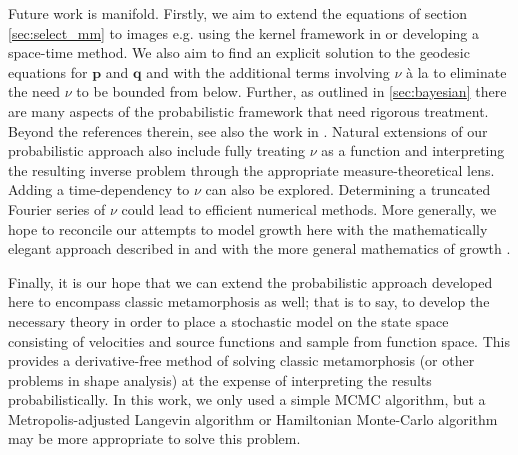 \documentclass[runningheads]{llncs}
\begin{document}
Future work is manifold. Firstly, we aim to extend the equations of section
\ref{sec:select_mm} to images e.g. using the kernel framework in
\cite{richardson2016metamorphosis} or developing a space-time method. We also
aim to find an explicit solution to the geodesic equations for $\mathbf p$ and
$\mathbf q$ and with the additional terms involving $\nu$ à la
\cite{trouve2005local} to eliminate the need $\nu$ to be bounded from below.
Further, as outlined in \ref{sec:bayesian} there
are many aspects of the probabilistic framework that need rigorous treatment.
Beyond the references therein, see also the work in \cite{dashti2013map}.
Natural extensions of our probabilistic approach also include fully treating
$\nu$ as a function and interpreting the resulting inverse problem through the
appropriate measure-theoretical lens. Adding a time-dependency to $\nu$ can also
be explored. Determining a truncated Fourier series of $\nu$ could lead to
efficient numerical methods. More generally, we hope to reconcile our attempts
to model growth here with the mathematically elegant approach described in
\cite{kaltenmark2016geometrical} and with the more general mathematics of growth
\cite{goriely2017mathematics}.

Finally, it is our hope that we can extend the probabilistic approach developed
here to encompass classic metamorphosis as well; that is to say, to develop the
necessary theory in order to place a stochastic model on the state space
consisting of velocities and source functions and sample from function space.
This provides a derivative-free method of solving classic metamorphosis (or
other problems in shape analysis) at the expense of interpreting the results
probabilistically.
In this work, we only used a simple MCMC algorithm, but a Metropolis-adjusted 
Langevin algorithm or Hamiltonian Monte-Carlo algorithm may be more appropriate 
to solve this problem.




\end{document}
